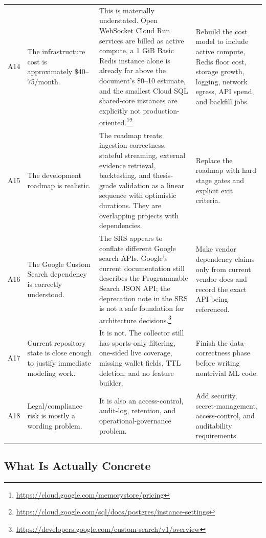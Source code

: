 \documentclass[11pt,letterpaper]{article}
\begin{document}
\begin{longtable}{p{0.7cm}p{3.7cm}p{5.0cm}p{5.0cm}}
\addlinespace
A14 & The infrastructure cost is approximately \$40--75/month. & This is materially understated. Open WebSocket Cloud Run services are billed as active compute, a 1 GiB Basic Redis instance alone is already far above the document's \$0--10 estimate, and the smallest Cloud SQL shared-core instances are explicitly not production-oriented.\footnote{\url{https://cloud.google.com/memorystore/pricing}}\footnote{\url{https://cloud.google.com/sql/docs/postgres/instance-settings}} & Rebuild the cost model to include active compute, Redis floor cost, storage growth, logging, network egress, API spend, and backfill jobs. \\
\addlinespace
A15 & The development roadmap is realistic. & The roadmap treats ingestion correctness, stateful streaming, external evidence retrieval, backtesting, and thesis-grade validation as a linear sequence with optimistic durations. They are overlapping projects with dependencies. & Replace the roadmap with hard stage gates and explicit exit criteria. \\
\addlinespace
A16 & The Google Custom Search dependency is correctly understood. & The SRS appears to conflate different Google search APIs. Google's current documentation still describes the Programmable Search JSON API; the deprecation note in the SRS is not a safe foundation for architecture decisions.\footnote{\url{https://developers.google.com/custom-search/v1/overview}} & Make vendor dependency claims only from current vendor docs and record the exact API being referenced. \\
\addlinespace
A17 & Current repository state is close enough to justify immediate modeling work. & It is not. The collector still has sports-only filtering, one-sided live coverage, missing wallet fields, TTL deletion, and no feature builder. & Finish the data-correctness phase before writing nontrivial ML code. \\
\addlinespace
A18 & Legal/compliance risk is mostly a wording problem. & It is also an access-control, audit-log, retention, and operational-governance problem. & Add security, secret-management, access-control, and auditability requirements. \\
\bottomrule
\end{longtable}
\endgroup

\subsection{What Is Actually Concrete}
\end{document}
